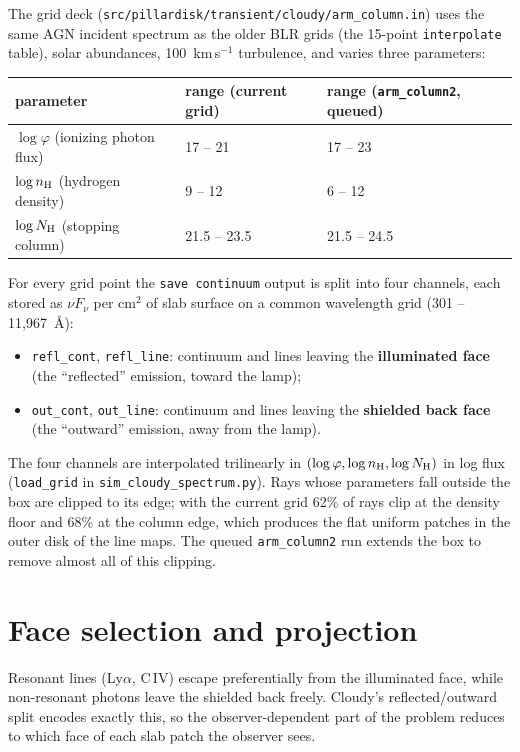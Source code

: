 \documentclass[11pt]{article}
\newcommand{\nH}{n_{\rm H}}
\begin{document}
The grid deck (\texttt{src/pillardisk/transient/cloudy/arm\_column.in}) uses the same
AGN incident spectrum as the older BLR grids (the 15-point
\texttt{interpolate} table), solar abundances, 100~km\,s$^{-1}$
turbulence, and varies three parameters:
\begin{center}
\begin{tabular}{lll}
\toprule
parameter & range (current grid) & range (\texttt{arm\_column2}, queued)\\
\midrule
$\log \varphi$ (ionizing photon flux) & 17 -- 21 & 17 -- 23\\
$\log \nH$ (hydrogen density)         & 9 -- 12  & 6 -- 12\\
$\log N_{\rm H}$ (stopping column)    & 21.5 -- 23.5 & 21.5 -- 24.5\\
\bottomrule
\end{tabular}
\end{center}
For every grid point the \texttt{save continuum} output is split into
four channels, each stored as $\nu F_\nu$ per cm$^2$ of slab surface
on a common wavelength grid (301 -- 11{,}967~\AA):
\begin{itemize}
\item \texttt{refl\_cont}, \texttt{refl\_line}: continuum and lines
      leaving the \textbf{illuminated face} (the ``reflected''
      emission, toward the lamp);
\item \texttt{out\_cont}, \texttt{out\_line}: continuum and lines
      leaving the \textbf{shielded back face} (the ``outward''
      emission, away from the lamp).
\end{itemize}
The four channels are interpolated trilinearly in
$(\log\varphi, \log\nH, \log N_{\rm H})$ in log flux
(\texttt{load\_grid} in \texttt{sim\_cloudy\_spectrum.py}). Rays whose
parameters fall outside the box are clipped to its edge; with the
current grid 62\% of rays clip at the density floor and 68\% at the
column edge, which produces the flat uniform patches in the outer disk
of the line maps. The queued \texttt{arm\_column2} run extends the box
to remove almost all of this clipping.

\section{Face selection and projection}

Resonant lines (Ly$\alpha$, C\,IV) escape preferentially from the
illuminated face, while non-resonant photons leave the shielded back
freely. Cloudy's reflected/outward split encodes exactly this, so the
observer-dependent part of the problem reduces to which face of each
slab patch the observer sees.
\end{document}
